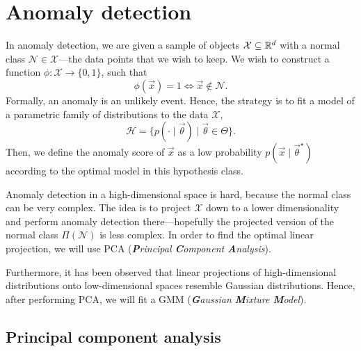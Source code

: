 \section{Anomaly detection}

In anomaly detection, we are given a sample of objects $\mathcal{X} \subseteq \mathbb{R}^d$ with a normal
class $\mathcal{N} \in \mathcal{X}$---the data points that we wish to keep. We wish to construct a
function $\phi: \mathcal{X} \to \{ 0,1 \}$, such that \[
    \phi(\vec{x}) = 1 \iff \vec{x} \not\in \mathcal{N}.
\]
Formally, an anomaly is an unlikely event. Hence, the strategy is to fit a model of a parametric
family of distributions to the data $\mathcal{X}$, \[
    \mathcal{H} = \{ p(\cdot \mid \vec{\theta}) \mid \vec{\theta} \in \Theta \}.
\]
Then, we define the anomaly score of $\vec{x}$ as a low probability $p(\vec{x} \mid
    \vec{\theta}^\star)$ according to the optimal model in this hypothesis class.

Anomaly detection in a high-dimensional space is hard, because the normal class can be very
complex. The idea is to project $\mathcal{X}$ down to a lower dimensionality and perform anomaly
detection there---hopefully the projected version of the normal class $\Pi(\mathcal{N})$ is less
complex. In order to find the optimal linear projection, we will use PCA
(\textit{\textbf{P}rincipal \textbf{C}omponent \textbf{A}nalysis}).

Furthermore, it has been observed that linear projections of high-dimensional distributions onto
low-dimensional spaces resemble Gaussian distributions. Hence, after performing PCA, we will fit a
GMM (\textit{\textbf{G}aussian \textbf{M}ixture \textbf{M}odel}).

\subsection{Principal component analysis}

